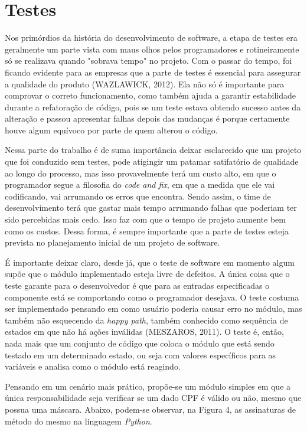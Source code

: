 \documentclass[
    12pt,       %
    openright,      %
    twoside,      %
    a4paper,      %
    english,      %
    french,       %
    spanish,      %
    brazil,       %
    ]{abntex2}
\begin{document}
  \chapter{Testes}
      Nos primórdios da história do desenvolvimento de software, a etapa de testes
      era geralmente um parte vista com maus olhos pelos programadores e rotineiramente
      só se realizava quando "sobrava tempo" no projeto. Com o passar do tempo, foi
      ficando evidente para as empresas que a parte de testes é essencial para
      assegurar a qualidade do produto (WAZLAWICK, 2012). Ela não só é importante
      para comprovar o correto funcionamento, como também ajuda a garantir
      estabilidade durante a refatoração de código, pois se um teste estava obtendo
      sucesso antes da alteração e passou apresentar falhas depois das mudanças é
      porque certamente houve algum equívoco por parte de quem alterou o código.

      Nessa parte do trabalho é de suma importância deixar esclarecido
      que um projeto que foi conduzido sem testes, pode atigingir um patamar
      satifatório de qualidade ao longo do processo, mas isso provavelmente terá um
      custo alto, em que o programador segue a filosofia do \textit{code and fix},
      em que a medida que ele vai codificando, vai arrumando os erros que encontra.
      Sendo assim, o time de desenvolvimento terá que gastar mais tempo arrumando
      falhas que poderiam ter sido percebidas mais cedo. Isso faz com que o tempo
      de projeto aumente bem como os custos. Dessa forma, é sempre importante que
      a parte de testes esteja prevista no planejamento inicial de um projeto de software.

      É importante deixar claro, desde já, que o teste de software em momento
      algum supõe que o módulo implementado esteja livre de defeitos. A única coisa que o
      teste garante para o desenvolvedor é que para as entradas especificadas o
      componente está se comportando como o programador desejava. O teste costuma
      ser implementado pensando em como usuário poderia causar erro no módulo, mas
      também não esquecendo da \textit{happy path}, também conhecido como sequência
      de estados em que não há ações inválidas (MESZAROS, 2011). O teste é, então,
      nada mais que um conjunto de código que coloca o módulo que está sendo testado
      em um determinado estado, ou seja com valores específicos para as variáveis e
      analisa como o módulo está reagindo.

      Pensando em um cenário mais prático, propõe-se um módulo simples em que a única
      responsabilidade seja verificar se um dado CPF é válido ou não, mesmo que possua uma
      máscara. Abaixo, podem-se observar, na Figura 4, as assinaturas de método do
      mesmo na linguagem
      \textit{Python}.
\end{document}
